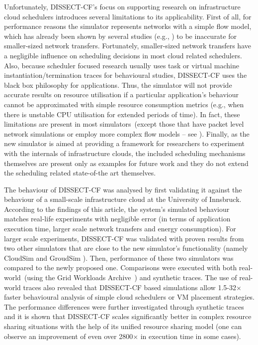 \documentclass[sort, compress, 5p]{elsarticle}
\begin{document}
Unfortunately, DISSECT-CF's focus on supporting research on infrastructure cloud schedulers introduces several limitations to its applicability. First of all, for performance reasons the simulator represents networks with a simple flow model, which has already been shown by several studies (e.g., \cite{SimGrid-velho2013validity}) to be inaccurate for smaller-sized network transfers. Fortunately, smaller-sized network transfers have a negligible influence on scheduling decisions in most cloud related schedulers. Also, because scheduler focused research usually uses task or virtual machine instantiation/termination traces for behavioural studies, DISSECT-CF uses the black box philosophy for applications. Thus, the simulator will not provide accurate results on resource utilisation if a particular application's behaviour cannot be approximated with simple resource consumption metrics (e.g., when there is unstable CPU utilisation for extended periods of time). In fact, these limitations are present in most simulators~(except those that have packet level network simulations or employ more complex flow models -- see \cite{GreenCloud-5683561, SimGrid-velho2009accuracy}). Finally, as the new simulator is aimed at providing a framework for researchers to experiment with the internals of infrastructure clouds, the included scheduling mechanisms themselves are present only as examples for future work and they do not extend the scheduling related state-of-the art themselves.

The behaviour of DISSECT-CF was analysed by first validating it against the behaviour of a small-scale infrastructure cloud at the University of Innsbruck. According to the findings of this article, the system's simulated behaviour matches real-life experiments with negligible error (in terms of  application execution time, larger scale network transfers and energy consumption). For larger scale experiments, DISSECT-CF was validated with proven results from two other simulators that are close to the new simulator's functionality (namely CloudSim \cite{CloudSim-calheiros2011CloudSim} and GroudSim \cite{GroudSim-ostermann2011groudsim}). Then, performance of these two simulators was compared to the newly proposed one. Comparisons were executed with both real-world~(using the Grid Workloads Archive~\cite{Iosup08thegrid}) and synthetic traces. The use of real-world traces also revealed that DISSECT-CF based simulations allow 1.5-32$\times$ faster behavioural analysis of simple cloud schedulers or VM placement strategies. The performance differences were further investigated through synthetic traces and it is shown that DISSECT-CF scales significantly better in complex resource sharing situations with the help of its unified resource sharing model (one can observe an improvement of even over 2800$\times$ in execution time in some cases).
\end{document}
